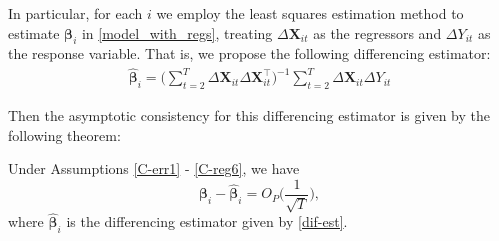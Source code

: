 \documentclass[a4paper,12pt]{article}
\begin{document}
In particular, for each $i$ we employ the least squares estimation method to estimate $\bm{\beta}_i$ in \eqref{model_with_regs}, treating $\Delta \mathbf{X}_{it}$ as the regressors and $\Delta Y_{it}$ as the response variable. That is, we propose the following differencing estimator:
\begin{align}\label{dif-est}
\widehat{\bm{\beta}}_i = \Big( \sum_{t=2}^T \Delta \mathbf{X}_{it} \Delta \mathbf{X}_{it}^\top \Big)^{-1} \sum_{t=2}^T \Delta \mathbf{X}_{it} \Delta Y_{it}
\end{align}

Then the asymptotic consistency for this differencing estimator is given by the following theorem:

\begin{theorem}\label{theo-regs}
Under Assumptions \ref{C-err1} - \ref{C-reg6}, we have
\[\bm{\beta}_i - \widehat{\bm{\beta}}_i  = O_P \Big(\frac{1}{\sqrt{T}}\Big),
\]
where $\widehat{\bm{\beta}}_i$ is the differencing estimator given by \eqref{dif-est}.
\end{theorem}


\end{document}
